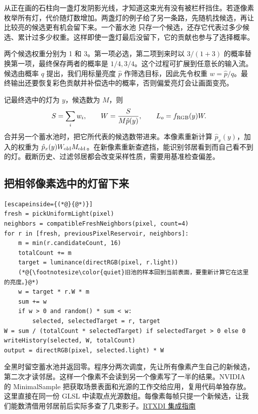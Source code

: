 从正在画的石柱向一盏灯发阴影光线，才知道这束光有没有被栏杆挡住。若逐像素枚举所有灯，代价随灯数增加。两盏灯的例子给了另一条路，先随机找候选，再让比较亮的候选更有机会留下来。一个蓄水池  只存一个候选，还存它代表过多少候选、累计过多少权重。这样即使一盏灯最后没留下，它的贡献也参与了选择概率。

两个候选权重分别为 1 和 3。第一项必选，第二项到来时以 $3/(1+3)$ 的概率替换第一项，最终保存两者的概率是 $1/4,3/4$。这个过程可扩展到任意长的输入流。候选由概率 $q$ 提出，我们用标量亮度 $\hat p$ 作筛选目标，因此先令权重 $w=\hat p/q$。最终输出还要恢复彩色贡献并补偿选中的概率，否则偏爱亮灯会让画面变亮。

记最终选中的灯为 $y$，候选数为 $M$，则
\[
  S=\sum_i w_i,\qquad W=\frac{S}{M\hat p(y)},\qquad L_o=f_{\rm RGB}(y)W.
\]
合并另一个蓄水池时，把它所代表的候选数带进来。本像素重新计算 $\hat p_x(y)$，加入的权重为 $\hat p_x(y)W_{\rm old}M_{\rm old}$。在新像素重新查遮挡，能识别邻居看到而自己看不到的灯。截断历史、过滤邻居都会改变采样性质，需要用基准检查偏差。
\clearpage
\subsection{把相邻像素选中的灯留下来}
\par\nopagebreak
\begin{lstlisting}[escapeinside={(*@}{@*)}]
fresh = pickUniformLight(pixel)
neighbors = compatibleFreshNeighbors(pixel, count=4)
for r in [fresh, previousPixelReservoir, neighbors]:
    m = min(r.candidateCount, 16)
    totalCount += m
    target = luminance(directRGB(pixel, r.light))
    (*@{\footnotesize\color{quiet}旧池的样本回到当前表面，要重新计算它在这里的亮度。}@*)
    w = target * r.W * m
    sum += w
    if w > 0 and random() * sum < w:
        selected, selectedTarget = r, target
W = sum / (totalCount * selectedTarget) if selectedTarget > 0 else 0
writeHistory(selected, W, totalCount)
output = directRGB(pixel, selected.light) * W
\end{lstlisting}
全黑时留空蓄水池并返回零。程序分两次调度，先让所有像素产生自己的新候选，第二次才读邻居。这样一个像素不会读到另一个像素写了一半的结果。NVIDIA 的 MinimalSample 把获取场景表面和光源的工作交给应用，复用代码单独存放。这里直接在同一份 GLSL 中读取点光源数组。每像素每帧只提一个新候选，让我们能数清借用邻居前后实际多查了几束影子。\href{https://github.com/NVIDIA-RTX/RTXDI/blob/main/Doc/Integration.md}{RTXDI 集成指南}

